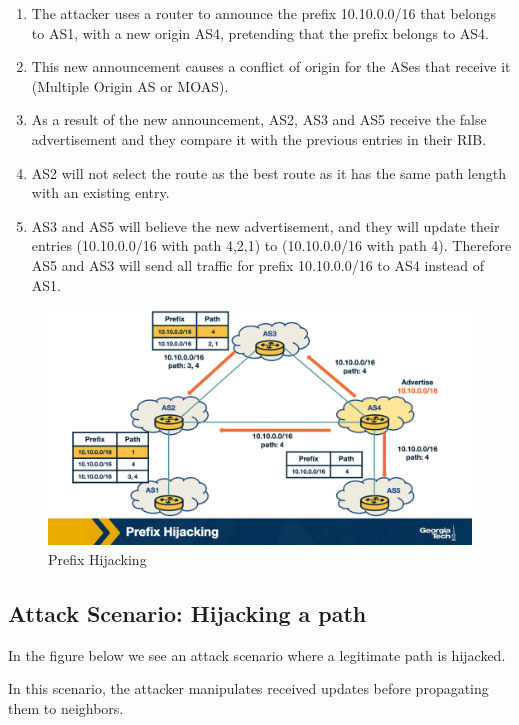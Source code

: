 \documentclass[11pt]{article}
\begin{document}
\begin{enumerate}
\item The attacker uses a router to announce the prefix 10.10.0.0/16 that belongs to AS1, with a new origin AS4, pretending that the prefix belongs to AS4.
\item This new announcement causes a conflict of origin for the ASes that receive it (Multiple Origin AS or MOAS).
\item As a result of the new announcement, AS2, AS3 and AS5 receive the false advertisement and they compare it with the previous entries in their RIB.
\item AS2 will not select the route as the best route as it has the same path length with an existing entry.
\item AS3 and AS5 will believe the new advertisement, and they will update their entries (10.10.0.0/16 with path 4,2,1) to (10.10.0.0/16 with path 4). Therefore AS5 and AS3 will send all traffic for prefix 10.10.0.0/16 to AS4 instead of AS1.
\end{enumerate}


\begin{figure}[htbp]
\centering
\includegraphics[width=.9\linewidth]{./MD_Figures/9_bgp_attacks_prefix_hijacking_1.png}
\caption{\label{fig:org49276b5}Prefix Hijacking}
\end{figure}

\subsection{Attack Scenario: Hijacking a path}
\label{sec:org5724c29}

In the figure below we see an attack scenario where a legitimate path is hijacked. 

In this scenario, the attacker manipulates received updates before propagating them to neighbors. 
\end{document}
